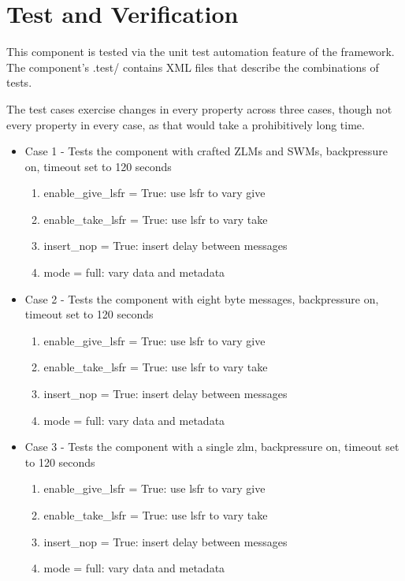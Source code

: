 \section*{Test and Verification}
\begin{flushleft}
This component is tested via the unit test automation feature of the framework. The component's .test/ contains XML files that describe the combinations of tests. \medskip

The test cases exercise changes in every property across three cases, though not every property in every case, as that would take a prohibitively long time.

\begin{itemize}
\item Case 1 - Tests the component with crafted ZLMs and SWMs, backpressure on, timeout set to 120 seconds
\begin{enumerate}
	\item enable\_give\_lsfr = True: use lsfr to vary give
	\item enable\_take\_lsfr = True: use lsfr to vary take
	\item insert\_nop = True: insert delay between messages
	\item mode = full: vary data and metadata
\end{enumerate}

\item Case 2 - Tests the component with eight byte messages, backpressure on, timeout set to 120 seconds
\begin{enumerate}
	\item enable\_give\_lsfr = True: use lsfr to vary give
	\item enable\_take\_lsfr = True: use lsfr to vary take
	\item insert\_nop = True: insert delay between messages
	\item mode = full: vary data and metadata
\end{enumerate}

\item Case 3 - Tests the component with a single zlm, backpressure on, timeout set to 120 seconds
\begin{enumerate}
	\item enable\_give\_lsfr = True: use lsfr to vary give
	\item enable\_take\_lsfr = True: use lsfr to vary take
	\item insert\_nop = True: insert delay between messages
	\item mode = full: vary data and metadata
\end{enumerate}


\end{itemize}
\end{flushleft}
